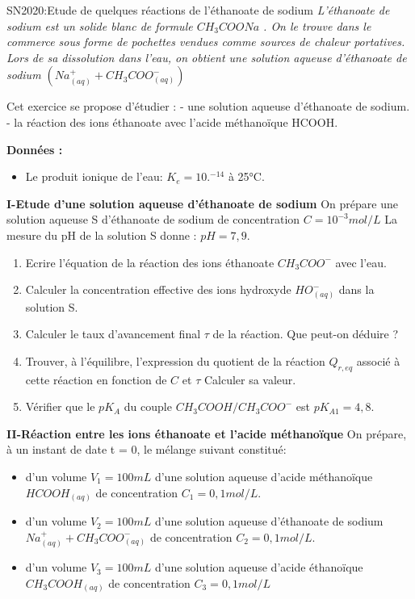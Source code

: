 \documentclass[12pt]{article}
\begin{document}
\begin{Box2}{SN2020:Etude de quelques réactions de l’éthanoate de sodium}
 \emph{L’éthanoate de sodium est un solide blanc de formule $CH_3COONa$ . On le trouve dans le
commerce sous forme de pochettes vendues comme sources de chaleur portatives. Lors de sa
dissolution dans l’eau, on obtient une solution aqueuse d’éthanoate de sodium $(Na^+_{(aq)} + CH_3COO^-_{(aq)})$} 

Cet exercice se propose d’étudier :
- une solution aqueuse d’éthanoate de sodium.
- la réaction des ions éthanoate avec l’acide méthanoïque HCOOH.

\textbf{Données :}
\begin{itemize}
  \item Le produit ionique de l’eau: $K_e = 10.^{-14}$ à 25°C.
\end{itemize}

  \textbf{I-Etude d’une solution aqueuse d’éthanoate de sodium}
  On prépare une solution aqueuse S d’éthanoate de sodium de concentration $C = 10^{-3}mol/L$
La mesure du pH de la solution S donne : $pH = 7,9$.

  \begin{enumerate}
    \item Ecrire l’équation de la réaction des ions éthanoate $CH_3COO^-$ avec l'eau.
    \item Calculer la concentration effective des ions hydroxyde $HO^-_{(aq)}$ dans la solution S.
    \item Calculer le taux d’avancement final $\tau$ de la réaction. Que peut-on déduire ?
    \item Trouver, à l’équilibre, l’expression du quotient de la réaction
$Q_{r,eq}$ associé à cette réaction en fonction de $C$ et $\tau$ Calculer sa valeur.
\item Vérifier que le $pK_A$ du couple $CH_3COOH/CH_3COO^-$ est $pK_{A1} = 4,8$.

\end{enumerate}
  \textbf{II-Réaction entre les ions éthanoate et l’acide méthanoïque}
  On prépare, à un instant de date t = 0, le mélange suivant constitué:
  \begin{itemize}
        \item d'un volume $V_1 = 100mL$ d’une solution aqueuse d’acide méthanoïque $HCOOH_{(aq)}$ de concentration $C_1=0,1mol/L$.
        
        \item d'un volume $V_2 = 100mL$ d’une solution aqueuse d’éthanoate de sodium $Na^+_{(aq)} + CH_3COO^-_{(aq)}$ de concentration $C_2=0,1mol/L$.
        \item d'un volume $V_3 = 100mL$ d’une solution aqueuse d’acide éthanoïque $CH_3COOH_{(aq)}$ de concentration $C_3 = 0,1 mol/L$


\end{itemize}
\end{Box2}
\end{document}
